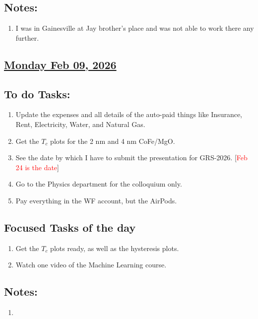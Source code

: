\subsection*{Notes:}
\begin{enumerate}
    \item I was in Gainesville at Jay brother's place and was not able to work there any further. 
\end{enumerate}
\subsection*{\underline{Monday Feb 09, 2026}}
\subsection*{To do Tasks:}
\begin{enumerate} 
    \item Update the expenses and all details of the auto-paid things like Insurance, Rent, Electricity, Water, and Natural Gas. \cmark

    \item Get the $T_c$ plots for the 2 nm and 4 nm CoFe/MgO. \cmark
    \item See the date by which I have to submit the presentation for GRS-2026. [\textcolor{red}{Feb 24 is the date}] \cmark
    \item Go to the Physics department for the colloquium only. \cmark
    \item Pay everything in the WF account, but the AirPods.
\end{enumerate}
\subsection*{Focused Tasks of the day}
\begin{enumerate}  %
    \item Get the $T_c$ plots ready, as well as the hysteresis plots. \cmark
    \item Watch one video of the Machine Learning course.
\end{enumerate}
\subsection*{Notes:}
\begin{enumerate}
    \item 
\end{enumerate}
